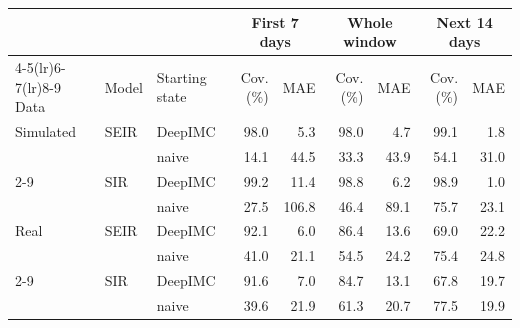 \begin{tabular}{lllrrrrrr}
\toprule
 &  &  & \multicolumn{2}{c}{First 7 days} & \multicolumn{2}{c}{Whole window} & \multicolumn{2}{c}{Next 14 days} \\
\cmidrule(lr){4-5}\cmidrule(lr){6-7}\cmidrule(lr){8-9}
Data & Model & Starting state & Cov. (\%) & MAE & Cov. (\%) & MAE & Cov. (\%) & MAE \\
\midrule
Simulated & SEIR & DeepIMC & 98.0 & 5.3 & 98.0 & 4.7 & 99.1 & 1.8 \\
 &  & naive & 14.1 & 44.5 & 33.3 & 43.9 & 54.1 & 31.0 \\
\cmidrule(lr){2-9}
 & SIR & DeepIMC & 99.2 & 11.4 & 98.8 & 6.2 & 98.9 & 1.0 \\
 &  & naive & 27.5 & 106.8 & 46.4 & 89.1 & 75.7 & 23.1 \\
\midrule
Real & SEIR & DeepIMC & 92.1 & 6.0 & 86.4 & 13.6 & 69.0 & 22.2 \\
 &  & naive & 41.0 & 21.1 & 54.5 & 24.2 & 75.4 & 24.8 \\
\cmidrule(lr){2-9}
 & SIR & DeepIMC & 91.6 & 7.0 & 84.7 & 13.1 & 67.8 & 19.7 \\
 &  & naive & 39.6 & 21.9 & 61.3 & 20.7 & 77.5 & 19.9 \\
\bottomrule
\end{tabular}
